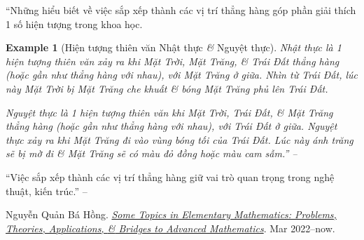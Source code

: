 \documentclass{article}
\numberwithin{equation}{section}
\newtheorem{example}{Example}[section]
\begin{document}
``Những hiểu biết về việc sắp xếp thành các vị trí thẳng hàng góp phần giải thích 1 số hiện tượng trong khoa học.

\begin{example}[Hiện tượng thiên văn Nhật thực \textit{\&} Nguyệt thực]
	\emph{Nhật thực} là 1 hiện tượng thiên văn xảy ra khi Mặt Trời, Mặt Trăng, \textit{\&} Trái Đất thẳng hàng (hoặc gần như thẳng hàng với nhau), với Mặt Trăng ở giữa. Nhìn từ Trái Đất, lúc này Mặt Trời bị Mặt Trăng che khuất \textit{\&} bóng Mặt Trăng phủ lên Trái Đất.
	
	\emph{Nguyệt thực} là 1 hiện tượng thiên văn khi Mặt Trời, Trái Đất, \textit{\&} Mặt Trăng thẳng hàng (hoặc gần như thẳng hàng với nhau), với Trái Đất ở giữa. Nguyệt thực xảy ra khi Mặt Trăng đi vào vùng bóng tối của Trái Đất. Lúc này ánh trăng sẽ bị mờ đi \textit{\&} Mặt Trăng sẽ có màu đỏ đồng hoặc màu cam sẫm.'' -- \cite[p. 105]{Thai_Anh_Dat_Ha_Loan_Nam_Quang_Toan_6_tap_2}
\end{example}
``Việc sắp xếp thành các vị trí thẳng hàng giữ vai trò quan trọng trong nghệ thuật, kiến trúc.'' -- \cite[p. 106]{Thai_Anh_Dat_Ha_Loan_Nam_Quang_Toan_6_tap_2}


\begin{thebibliography}{99}
	 Nguyễn Quản Bá Hồng. \href{https://github.com/NQBH/hobby/blob/master/elementary_mathematics/NQBH_elementary_mathematics.pdf}{\textit{Some Topics in Elementary Mathematics: Problems, Theories, Applications, \textit{\&} Bridges to Advanced Mathematics}}. Mar 2022--now.
\end{thebibliography}


\printbibliography[heading=bibintoc]
	
\end{document}
